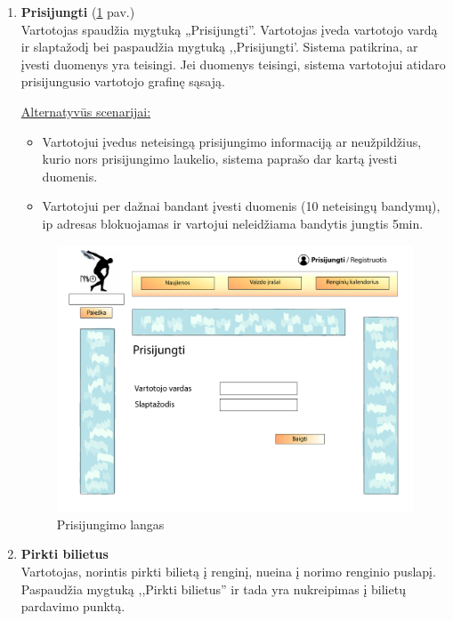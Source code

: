 \documentclass{VUMIFPSkursinis}
\begin{document}
\begin{enumerate} [label = \textbf{U\arabic*.}]
			\item \textbf{Prisijungti} (\ref{fig:uzd_prisijungti} pav.)\\
					Vartotojas spaudžia mygtuką „Prisijungti''. Vartotojas įveda vartotojo vardą ir slaptažodį bei paspaudžia mygtuką ,,Prisijungti'. Sistema patikrina, ar įvesti duomenys yra teisingi. Jei duomenys teisingi, sistema vartotojui atidaro prisijungusio vartotojo grafinę sąsają. 
					
				\underline{Alternatyvūs scenarijai:}
				\begin{itemize}
						\item Vartotojui įvedus neteisingą prisijungimo informaciją ar neužpildžius, kurio nors prisijungimo laukelio, sistema paprašo dar kartą įvesti duomenis.
						\item Vartotojui per dažnai bandant įvesti duomenis (10 neteisingų bandymų), ip adresas blokuojamas ir vartojui neleidžiama bandytis jungtis 5min. 
				\end{itemize}

				\begin{figure}[H]
					\centering
					\includegraphics[width=\textwidth]{img/PSI4/Prisijungimas-01.jpg}
					\caption{Prisijungimo langas}
					\label{fig:uzd_prisijungti}
				\end{figure}
			
			\item \textbf{Pirkti bilietus} \\
				Vartotojas, norintis pirkti bilietą į renginį, nueina į norimo renginio puslapį. Paspaudžia mygtuką ,,Pirkti bilietus'' ir tada yra nukreipimas į bilietų pardavimo punktą.
				

\end{enumerate}
\end{document}
